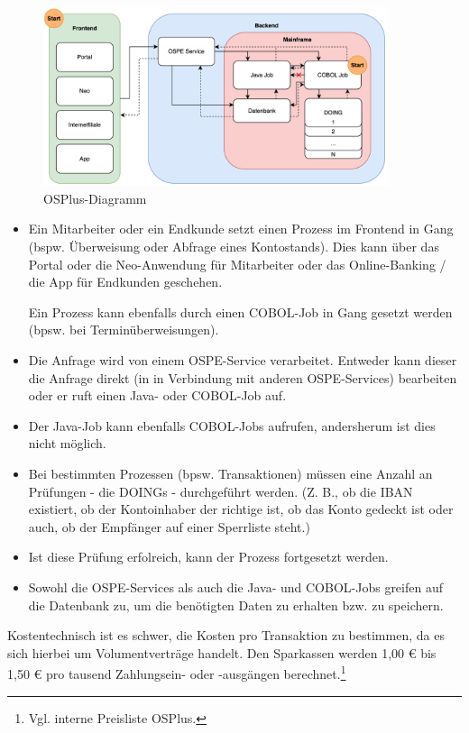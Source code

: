 \documentclass[12pt, a4paper]{article}
\begin{document}
{\begin{figure}[ht]
    \centering\includegraphics[width=0.9\textwidth]{Abbildungen/OSPlus-Diagramm.png}
    \caption{OSPlus-Diagramm}
\end{figure}

\begin{itemize}
    \item Ein Mitarbeiter oder ein Endkunde setzt einen Prozess im Frontend in Gang (bspw. Überweisung oder Abfrage eines Kontostands).
    Dies kann über das Portal oder die Neo-Anwendung für Mitarbeiter oder das Online-Banking / die App für Endkunden geschehen.

    Ein Prozess kann ebenfalls durch einen COBOL-Job in Gang gesetzt werden (bpsw. bei Terminüberweisungen).
    \item Die Anfrage wird von einem OSPE-Service verarbeitet.
    Entweder kann dieser die Anfrage direkt (in in Verbindung mit anderen OSPE-Services) bearbeiten oder er ruft einen Java- oder COBOL-Job auf.
    \item Der Java-Job kann ebenfalls COBOL-Jobs aufrufen, andersherum ist dies nicht möglich.
    \item Bei bestimmten Prozessen (bpsw. Transaktionen) müssen eine Anzahl an Prüfungen - die DOINGs - durchgeführt werden. 
    (Z. B., ob die IBAN existiert, ob der Kontoinhaber der richtige ist, ob das Konto gedeckt ist oder auch, ob der Empfänger auf einer Sperrliste steht.) 
    \item Ist diese Prüfung erfolreich, kann der Prozess fortgesetzt werden.
    \item Sowohl die OSPE-Services als auch die Java- und COBOL-Jobs greifen auf die Datenbank zu, um die benötigten Daten zu erhalten bzw. zu speichern. 
\end{itemize}

Kostentechnisch ist es schwer, die Kosten pro Transaktion zu bestimmen, da es sich hierbei um Volumentverträge handelt.
Den Sparkassen werden 1,00 € bis 1,50 € pro tausend Zahlungsein- oder -ausgängen berechnet.\footnote{Vgl. interne Preisliste OSPlus.}

}
\end{document}
